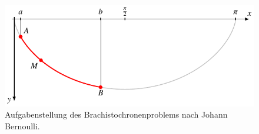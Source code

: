 %
%
%
\begin{figure}
\centering
\includegraphics{chapters/020-variation/images/brachistochronenproblem.pdf}
\caption{Aufgabenstellung des Brachistochronenproblems nach
Johann Bernoulli.
\label{buch:variation:problem:brachistochronenproblem}}
\end{figure}

